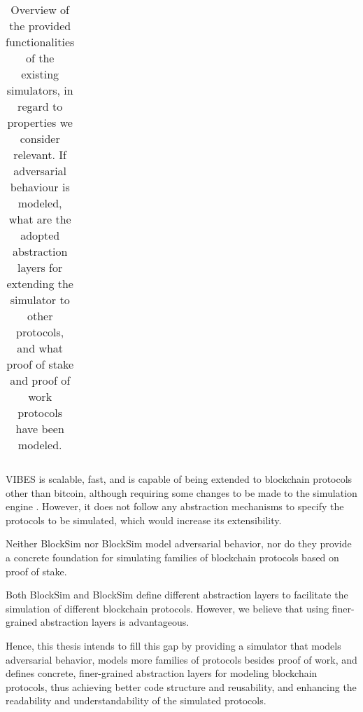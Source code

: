\begin{table}[h]
\begin{tabular}{|c|c|c|c|c|}
\end{tabular}
\caption{Overview of the provided functionalities of the existing simulators, in regard to properties we consider relevant. If adversarial behaviour is modeled, what are the adopted abstraction layers for extending the simulator to other protocols, and what proof of stake and proof of work protocols have been modeled.}
\end{table}

VIBES \cite{vibes} is scalable, fast, and is capable of being extended to blockchain protocols other than bitcoin, although requiring some changes to be made to the simulation engine \cite{evibes}. However, it does not follow any abstraction mechanisms to specify the protocols to be simulated, which would increase its extensibility.

Neither BlockSim \cite{blocksim1} nor BlockSim \cite{blocksim2} model adversarial behavior, nor do they provide a concrete foundation for simulating families of blockchain protocols based on proof of stake.

Both BlockSim \cite{blocksim1} and BlockSim \cite{blocksim2} define different abstraction layers to facilitate the simulation of different blockchain protocols. However, we believe that using finer-grained abstraction layers is advantageous.

\vspace{0.25cm}

Hence, this thesis intends to fill this gap by providing a simulator that models adversarial behavior, models more families of protocols besides proof of work, and defines concrete, finer-grained abstraction layers for modeling blockchain protocols, thus achieving better code structure and reusability, and enhancing the readability and understandability of the simulated protocols.


